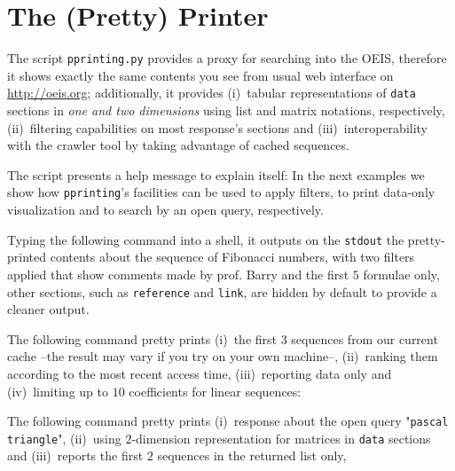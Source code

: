 \iffalse
Finally, the function \verb|oeis| puts all together and it is the main
interface exported by the \verb|crawling| module:
\inputminted[fontsize=\small,stripnl=false,firstline=195,lastline=221]
    {python}{deps/oeis-tools/src/crawling.py}
\fi

\section{The (Pretty) Printer}

The script \verb|pprinting.py| provides a proxy for searching into the OEIS,
therefore it shows exactly the same contents you see from usual web interface
on \url{http://oeis.org}; additionally, it provides (i)~tabular representations
of \verb|data| sections in \textit{one and two dimensions} using list and
matrix notations, respectively, (ii)~filtering capabilities on most response's
sections and (iii)~interoperability with the crawler tool by taking advantage of
cached sequences.

The script presents a help message to explain itself:
 In the next examples
we show how \verb|pprinting|'s facilities can be used to apply filters, to
print data-only visualization and to search by an open query, respectively.

\begin{example} Typing the following command into a shell, it outputs
on the \verb|stdout| the pretty-printed contents about the sequence of
Fibonacci numbers, with two filters applied that show comments made by
prof. Barry and the first $5$ formulae only,
other sections, such as \verb|reference| and \verb|link|, are hidden by
default to provide a cleaner output.
\end{example}

\begin{example}
The following command pretty prints (i)~the first 3 sequences from our current
cache --the result may vary if you try on your own machine--, (ii)~ranking them
according to the most recent access time, (iii)~reporting data only and
(iv)~limiting up to $10$ coefficients for linear sequences:
\end{example}

\begin{example}
The following command pretty prints (i)~response about the open query
"\verb|pascal triangle|", (ii)~using $2$-dimension representation for matrices
in \verb|data| sections and (iii)~reports the first $2$ sequences in the
returned list only,
\end{example}

